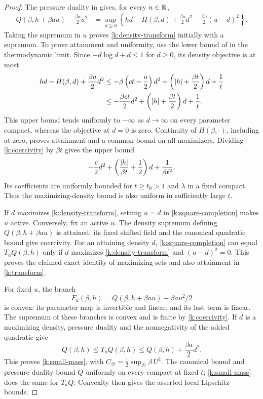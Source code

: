 \begin{proof}
The pressure duality in  gives, for every $u\in\mathbb R$,
\begin{align}
 Q(\beta,h+\beta au)-\frac{\beta a}{2}u^2
 &=\sup_{d\ge0}\left\{
 hd-H(\beta,d)+\frac{\beta a}{2}d^2
       -\frac{\beta a}{2}(u-d)^2\right\}.
 \label{k:square-completion}
\end{align}
Taking the supremum in $u$ proves \eqref{k:density-transform} initially
with a supremum.  To prove attainment and uniformity, use the lower bound
of  in the thermodynamic limit.  Since
$-d\log d+d\le1$ for $d\ge0$, its density objective is at most
\begin{align}
 hd-H(\beta,d)+\frac{\beta a}{2}d^2
 &\le-\beta\left(ct-\frac a2\right)d^2
       +\left(\left|h\right|+\frac{\beta t}{2}\right)d+\frac1t\notag\\
 &\le-\frac{\beta ct}{2}d^2
       +\left(\left|h\right|+\frac{\beta t}{2}\right)d+\frac1t.
 \label{k:coercivity}
\end{align}
This upper bound tends uniformly to $-\infty$ as $d\to\infty$ on every
parameter compact, whereas the objective at $d=0$ is zero.  Continuity
of $H(\beta,\cdot)$, including at zero, proves attainment and a common
bound on all maximizers.  Dividing \eqref{k:coercivity} by $\beta t$
gives the upper bound
\[
 -\frac c2d^2+
 \left(\frac{\left|h\right|}{\beta t}+\frac12\right)d+
 \frac1{\beta t^2}.
\]
Its coefficients are uniformly bounded for $t\ge t_0>1$ and $\lambda$
in a fixed compact.  Thus the maximizing-density bound is also uniform
in sufficiently large $t$.

If $d$ maximizes \eqref{k:density-transform}, setting $u=d$ in
\eqref{k:square-completion} makes $u$ active.  Conversely, fix an active
$u$.  The density supremum defining $Q(\beta,h+\beta au)$ is attained:
its fixed shifted field and the canonical quadratic bound give coercivity.
For an attaining density $d$, \eqref{k:square-completion} can equal
$T_aQ(\beta,h)$ only if $d$ maximizes \eqref{k:density-transform} and
$(u-d)^2=0$.  This proves the claimed exact identity of maximizing sets
and also attainment in \eqref{k:transform}.

For fixed $u$, the branch
\[
 F_u(\beta,h)=Q(\beta,h+\beta au)-\beta au^2/2
\]
is convex: its parameter map is invertible and linear, and its last
term is linear.  The supremum of these branches is convex and is finite
by \eqref{k:coercivity}.  If $d$ is a maximizing density, pressure
duality and the nonnegativity of the added quadratic give
\[
 Q(\beta,h)\le T_aQ(\beta,h)
 \le Q(\beta,h)+\frac{\beta a}{2}d^2.
\]
This proves \eqref{k:small-mass}, with
$C_{\mathcal D}=\tfrac12\sup_{\mathcal D}\beta\, U^2$.
The canonical bound and pressure duality bound $Q$ uniformly on every
compact at fixed $t$; \eqref{k:small-mass} does the same for $T_aQ$.
Convexity then gives the asserted local Lipschitz bounds.
\end{proof}

